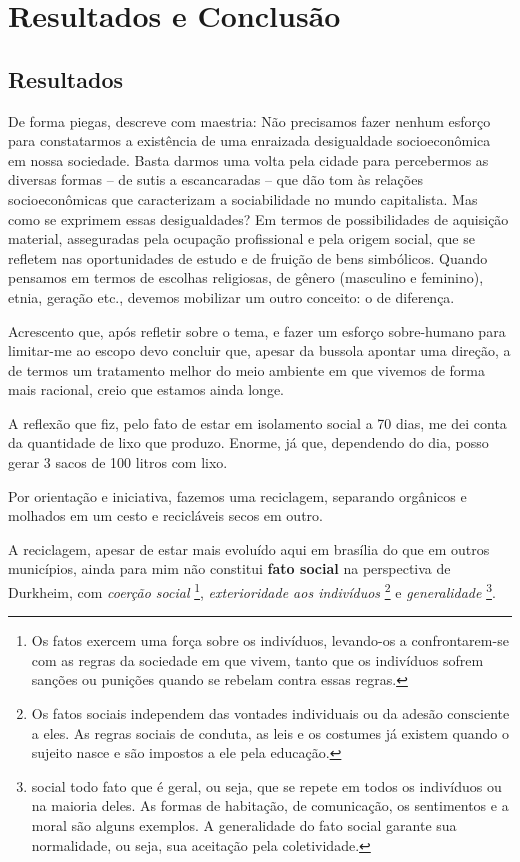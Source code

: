 \chapter{Resultados e Conclusão}

\section{Resultados}

De forma piegas,  descreve com maestria: Não precisamos fazer nenhum esforço para constatarmos a existência de uma enraizada desigualdade socioeconômica em nossa sociedade. Basta darmos
uma volta pela cidade para percebermos as diversas formas – de sutis a escancaradas
– que dão tom às relações socioeconômicas que caracterizam a sociabilidade
no mundo capitalista. Mas como se exprimem essas desigualdades?
Em termos de possibilidades de aquisição material, asseguradas pela ocupação
profissional e pela origem social, que se refletem nas oportunidades de
estudo e de fruição de bens simbólicos. Quando pensamos em termos de escolhas
religiosas, de gênero (masculino e feminino), etnia, geração etc., devemos
mobilizar um outro conceito: o de diferença.

Acrescento que, após refletir sobre o tema, e fazer um esforço sobre-humano para limitar-me ao escopo
devo concluir que, apesar da bussola apontar uma direção, a de termos um tratamento melhor do
meio ambiente em que vivemos de forma mais racional, creio que estamos ainda longe.

A reflexão que fiz, pelo fato de estar em isolamento social a 70 dias, me dei conta da quantidade de lixo que produzo.
Enorme, já que, dependendo do dia, posso gerar 3 sacos de 100 litros com lixo.

Por orientação e iniciativa, fazemos uma reciclagem, separando orgânicos e molhados em um cesto e recicláveis secos em outro.

A reciclagem, apesar de estar mais evoluído aqui em brasília do que em outros municípios, ainda para mim não constitui \textbf{fato social} na perspectiva de Durkheim, com
\textit{coerção social} \footnote{Os fatos exercem uma força sobre os indivíduos, levando-os a
confrontarem-se com as regras da sociedade em que vivem, tanto que os indivíduos sofrem sanções ou punições quando se rebelam contra essas regras.},
\textit{exterioridade aos indivíduos} \footnote{Os fatos sociais independem das vontades individuais ou da adesão consciente a eles. As regras sociais de conduta, as leis e os costumes já existem quando o sujeito nasce e são impostos a ele pela educação.} e
\textit{generalidade} \footnote{social todo fato que é geral, ou seja, que se repete em todos os indivíduos ou na maioria deles. As formas de habitação, de comunicação, os sentimentos e a moral são alguns exemplos. A generalidade do fato social garante sua normalidade, ou seja, sua aceitação pela coletividade.}.

